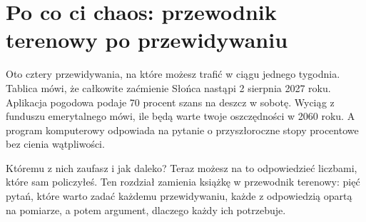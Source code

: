 
\chapter{Po co ci chaos: przewodnik terenowy po przewidywaniu}
\label{ch:why}

\noindent
Oto cztery przewidywania, na które możesz trafić w ciągu jednego tygodnia.
Tablica mówi, że całkowite zaćmienie Słońca nastąpi 2 sierpnia 2027 roku.
Aplikacja pogodowa podaje 70 procent szans na deszcz w sobotę. Wyciąg z
funduszu emerytalnego mówi, ile będą warte twoje oszczędności w 2060 roku.
A program komputerowy odpowiada na pytanie o przyszłoroczne stopy
procentowe bez cienia wątpliwości.

Któremu z nich zaufasz i jak daleko? Teraz możesz na to odpowiedzieć
liczbami, które sam policzyłeś. Ten rozdział zamienia książkę w przewodnik
terenowy: pięć pytań, które warto zadać każdemu przewidywaniu, każde z
odpowiedzią opartą na pomiarze, a potem argument, dlaczego każdy ich
potrzebuje.

\begin{outcomes}
\end{outcomes}

